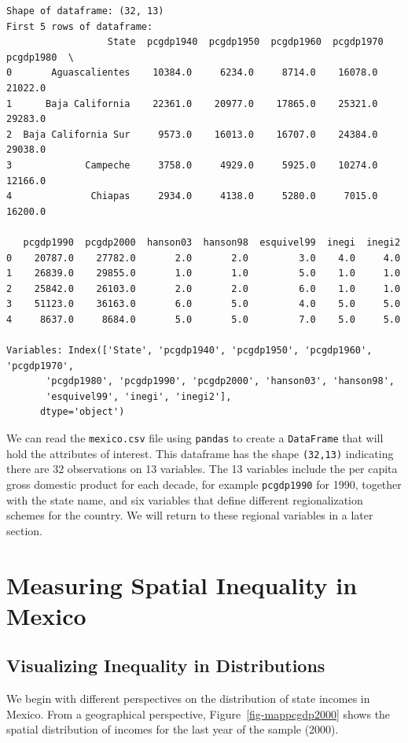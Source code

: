 \documentclass[
  a4paper, 
  twoside,
  final
]{article}
\begin{document}
\begin{verbatim}
Shape of dataframe: (32, 13)
First 5 rows of dataframe:
                  State  pcgdp1940  pcgdp1950  pcgdp1960  pcgdp1970  pcgdp1980  \
0       Aguascalientes    10384.0     6234.0     8714.0    16078.0    21022.0   
1      Baja California    22361.0    20977.0    17865.0    25321.0    29283.0   
2  Baja California Sur     9573.0    16013.0    16707.0    24384.0    29038.0   
3             Campeche     3758.0     4929.0     5925.0    10274.0    12166.0   
4              Chiapas     2934.0     4138.0     5280.0     7015.0    16200.0   

   pcgdp1990  pcgdp2000  hanson03  hanson98  esquivel99  inegi  inegi2  
0    20787.0    27782.0       2.0       2.0         3.0    4.0     4.0  
1    26839.0    29855.0       1.0       1.0         5.0    1.0     1.0  
2    25842.0    26103.0       2.0       2.0         6.0    1.0     1.0  
3    51123.0    36163.0       6.0       5.0         4.0    5.0     5.0  
4     8637.0     8684.0       5.0       5.0         7.0    5.0     5.0  

Variables: Index(['State', 'pcgdp1940', 'pcgdp1950', 'pcgdp1960', 'pcgdp1970',
       'pcgdp1980', 'pcgdp1990', 'pcgdp2000', 'hanson03', 'hanson98',
       'esquivel99', 'inegi', 'inegi2'],
      dtype='object')
\end{verbatim}

We can read the \texttt{mexico.csv} file using \texttt{pandas} to create
a \texttt{DataFrame} that will hold the attributes of interest. This
dataframe has the shape \texttt{(32,13)} indicating there are 32
observations on 13 variables. The 13 variables include the per capita
gross domestic product for each decade, for example \texttt{pcgdp1990}
for 1990, together with the state name, and six variables that define
different regionalization schemes for the country. We will return to
these regional variables in a later section.

\section{Measuring Spatial Inequality in
Mexico}\label{measuring-spatial-inequality-in-mexico}

\subsection{Visualizing Inequality in
Distributions}\label{visualizing-inequality-in-distributions}

We begin with different perspectives on the distribution of state
incomes in Mexico. From a geographical perspective,
Figure~\ref{fig-mappcgdp2000} shows the spatial distribution of incomes
for the last year of the sample (2000).
\end{document}
